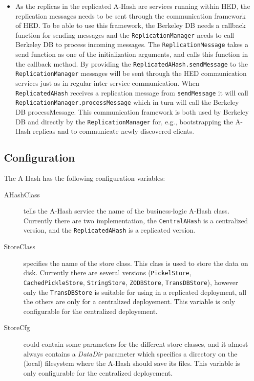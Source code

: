\documentclass{book}
\begin{document}
\begin{description}
\begin{itemize}
	\item As the replicas in the replicated A-Hash are services running within HED, the replication messages needs to be sent through the communication framework of HED. To be able to use this framework, the Berkeley DB needs a callback function for sending messages and the \verb!ReplicationManager! needs to call Berkeley DB to process incoming messages. The \verb!ReplicationMessage! takes a send function as one of the initialization arguments, and calls this function in the callback method. By providing the \verb!ReplicatedAHash.sendMessage! to the \verb!ReplicationManager! messages will be sent through the HED communication services just as in regular inter service communication. When \verb!ReplicatedAHash! receives a replication message from \verb!sendMessage! it will call \verb!ReplicationManager.processMessage! which in turn will call the Berkeley DB processMessage. This communication framework is both used by Berkeley DB and directly by the \verb!ReplicationManager! for, e.g., bootstrapping the A-Hash replicas and to communicate newly discovered clients.
\end{itemize}
\end{description}


\subsection{Configuration} %


The A-Hash has the following configuration variables:

\begin{description}
    \item[AHashClass] tells the A-Hash service the name of the business-logic A-Hash class. Currently there are two implementation, the \verb!CentralAHash! is a centralized version, and the \verb!ReplicatedAHash! is a replicated version.
    \item[StoreClass] specifies the name of the store class. This class is used to store the data on disk. Currently there are several versions (\verb!PickelStore!, \verb!CachedPickleStore!, \verb!StringStore!, \verb!ZODBStore!, \verb!TransDBStore!), however only the \verb!TransDBStore! is suitable for using in a replicated deployment, all the others are only for a centralized deployement. This variable is only configurable for the centralized deployement.
    \item[StoreCfg] could contain some parameters for the different store classes, and it almost always contains a \emph{DataDir} parameter which specifies a directory on the (local) filesystem where the A-Hash should save its files. This variable is only configurable for the centralized deployement.
\end{description}
\end{document}
